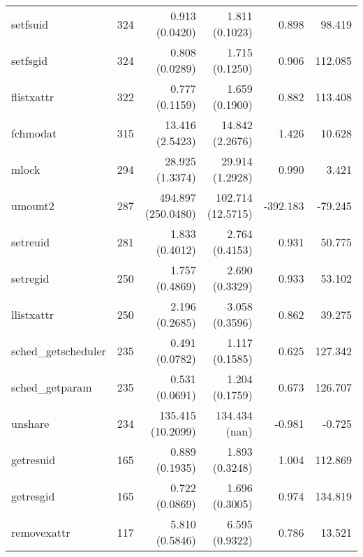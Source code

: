 \begin{longtable}{>{\ttfamily}lrrrrr}
                       setfsuid &        324 &              0.913 (0.0420) &            1.811 (0.1023) &           0.898 &       98.419 \\
                       setfsgid &        324 &              0.808 (0.0289) &            1.715 (0.1250) &           0.906 &      112.085 \\
                     flistxattr &        322 &              0.777 (0.1159) &            1.659 (0.1900) &           0.882 &      113.408 \\
                       fchmodat &        315 &             13.416 (2.5423) &           14.842 (2.2676) &           1.426 &       10.628 \\
                          mlock &        294 &             28.925 (1.3374) &           29.914 (1.2928) &           0.990 &        3.421 \\
                        umount2 &        287 &          494.897 (250.0480) &         102.714 (12.5715) &        -392.183 &      -79.245 \\
                       setreuid &        281 &              1.833 (0.4012) &            2.764 (0.4153) &           0.931 &       50.775 \\
                       setregid &        250 &              1.757 (0.4869) &            2.690 (0.3329) &           0.933 &       53.102 \\
                     llistxattr &        250 &              2.196 (0.2685) &            3.058 (0.3596) &           0.862 &       39.275 \\
            sched\_getscheduler &        235 &              0.491 (0.0782) &            1.117 (0.1585) &           0.625 &      127.342 \\
                sched\_getparam &        235 &              0.531 (0.0691) &            1.204 (0.1759) &           0.673 &      126.707 \\
                        unshare &        234 &           135.415 (10.2099) &             134.434 (nan) &          -0.981 &       -0.725 \\
                      getresuid &        165 &              0.889 (0.1935) &            1.893 (0.3248) &           1.004 &      112.869 \\
                      getresgid &        165 &              0.722 (0.0869) &            1.696 (0.3005) &           0.974 &      134.819 \\
                    removexattr &        117 &              5.810 (0.5846) &            6.595 (0.9322) &           0.786 &       13.521 \\

\end{longtable}
